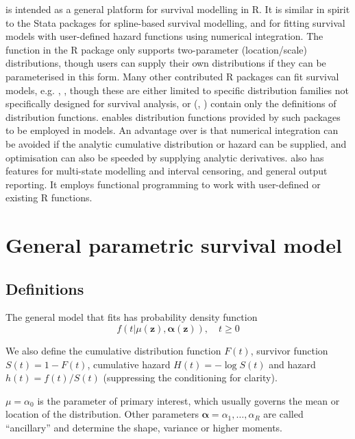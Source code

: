 \documentclass[nojss,nofooter]{jss}
\begin{document}
 is intended as a general platform for survival
modelling in R.  It is similar in spirit to the Stata packages
 \citep{stpm2} for spline-based survival modelling, and
 \citep{stgenreg} for fitting survival models with
user-defined hazard functions using numerical integration. The
 function in the R package  only supports
two-parameter (location/scale) distributions, though users can supply
their own distributions if they can be parameterised in this form.
Many other contributed R packages can fit survival models,
e.g.  \citep{eha},  \citep{yee:wild}, though these
are either limited to specific distribution families not specifically
designed for survival analysis, or (,
\citet{actudistns}) contain only the definitions of distribution
functions.   enables distribution functions provided by
such packages to be employed in models.  An advantage over
 is that numerical integration can be avoided if the
analytic cumulative distribution or hazard can be supplied, and
optimisation can also be speeded by supplying analytic derivatives.
 also has features for multi-state modelling and
interval censoring, and general output reporting.  It employs
functional programming to work with user-defined or existing R
functions.



\section{General parametric survival model}

\subsection{Definitions} 

The general model that  fits has probability density function
\begin{equation}
  \label{eq:model}
  f(t | \mu(\mathbf{z}), \bm{\alpha}(\mathbf{z})), \quad t \geq 0  
\end{equation}

We also define the cumulative distribution function $F(t)$, survivor
function $S(t) = 1 - F(t)$, cumulative hazard $H(t) = -\log S(t)$ and
hazard $h(t) = f(t)/S(t)$ (suppressing the conditioning for clarity).

$\mu=\alpha_0$ is the parameter of primary interest,
which usually governs the mean or location of the distribution.  Other
parameters $\bm{\alpha} = \alpha_1, \ldots, \alpha_R$ are called
``ancillary'' and determine the shape, variance or higher moments.
\end{document}
